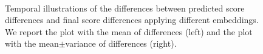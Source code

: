 \documentclass{article}
\begin{document}
\begin{figure}[htbp]
\hspace{-0.15in}\begin{minipage}[b]{.5\columnwidth}
\centering\
\end{minipage}%
\hspace{0.15in}\begin{minipage}[b]{.5\columnwidth}
\centering
{}
\end{minipage}
\vspace{-0.2in}
\caption{Temporal illustrations of the differences between predicted score differences and final score differences applying different embeddings. We report the plot with the mean of differences (left) and the plot with the mean$\pm$variance of differences (right).} 
\label{fig:temporal-diff}
\end{figure}
\end{document}
